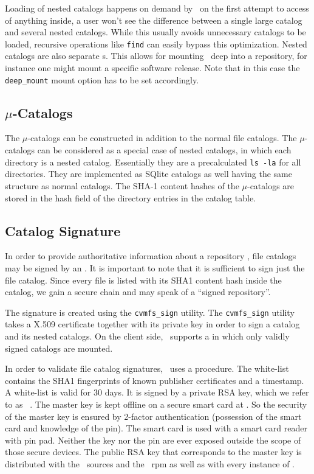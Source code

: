 Loading of nested catalogs happens on demand by \cvmfs\ on the first attempt to access of anything inside, \ie a user won't see the difference between a single large catalog and several nested catalogs.
While this usually avoids unnecessary catalogs to be loaded, recursive operations like \texttt{find} can easily bypass this optimization.
Nested catalogs are also separate s.
This allows for mounting \cvmfs\ deep into a repository, for instance one might mount a specific software release.
Note that in this case the \lstinline{deep_mount} mount option has to be set accordingly.


\subsection{$\mu$-Catalogs}
The $\mu$-catalogs can be constructed in addition to the normal file catalogs.
The $\mu$-catalogs can be considered as a special case of nested catalogs, in which each directory is a nested catalog.
Essentially they are a precalculated \texttt{ls -la} for all directories.
They are implemented as SQlite catalogs as well having the same structure as normal catalogs.
The SHA-1 content hashes of the $\mu$-catalogs are stored in the hash field of the directory entries in the catalog table.


\subsection{Catalog Signature}
In order to provide authoritative information about a repository , file catalogs may be signed by an  .
It is important to note that it is sufficient to sign just the file catalog.
Since every file is listed with its SHA1 content hash inside the catalog, we gain a secure chain and may speak of a ``signed repository''.

The signature is created using the \texttt{cvmfs\_sign} utility.
The \texttt{cvmfs\_sign} utility takes a X.509 certificate together with its private key in order to sign a catalog and its nested catalogs.
On the client side, \cvmfs\ supports a  in which only validly signed catalogs are mounted.

In order to validate file catalog signatures, \cvmfs\ uses a  procedure.
The white-list contains the SHA1 fingerprints of known publisher certificates and a timestamp.
A white-list is valid for 30 days.
It is signed by a private RSA key, which we refer to as \cernvm\ .
The master key is kept offline on a secure smart card at \cern.
So the security of the master key is ensured by 2-factor authentication (possession of the smart card and knowledge of the pin).
The smart card is used with a smart card reader with pin pad.
Neither the key nor the pin are ever exposed outside the scope of those secure devices.
The public RSA key that corresponds to the master key is distributed with the \cvmfs\ sources and the \cvmfs\ rpm as well as with every instance of \cernvm.

